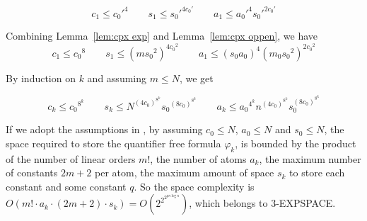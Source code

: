 \begin{lemma}\cite{Oppen73}\label{lem:cpx oppen}
$$c_1\le {c_0'}^4\qquad
s_1\le {s_0'}^{4c_0'}\qquad
a_1\le {a_0'}^4 {s_0'}^{2c_0'}
$$
\end{lemma}


Combining Lemma~\ref{lem:cpx exp} and Lemma~\ref{lem:cpx oppen}, we have
$$c_1\le {c_0}^8\qquad
s_1\le (m{s_0}^2)^{4{c_0}^2} \qquad
a_1\le (s_0a_0)^4(m_0{s_0}^2)^{2{c_0}^2} 
$$


By induction on $k$ and assuming $m\le N$, we get

\begin{lemma}
$$c_k\le {c_0}^{8^k}\qquad
s_k\le N^{(4c_0)^{ 8^k}} {s_0}^{(8c_0)^{ 8^k}} \qquad
a_k\le {a_0}^{4^k}n^{(4c_0)^{ 8^k}} s_0^{(8c_0)^{ 8^k}} $$
\end{lemma}

If we adopt the assumptions in \cite{Oppen73}, by assuming $c_0\le N$, $a_0\le N$ and $s_0\le N$, the space required to store the quantifier free formula $\varphi_k$, is bounded by the product of the number of linear orders $m!$, the number of atoms $a_k$, the maximum number of constants $2m+2$ per atom, the maximum amount of space $s_k$ to store each constant and some constant $q$. So the space complexity is $O(m! \cdot a_k \cdot (2m+2) \cdot s_k)=O(2^{2^{2^{pn \log n}}})$, which belongs to 3-EXPSPACE.
 

